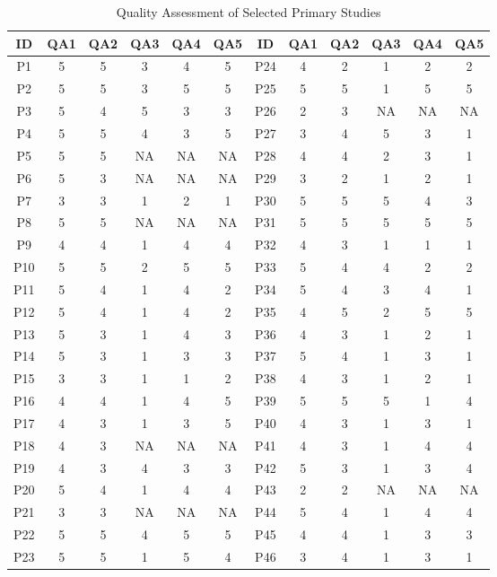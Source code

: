 \begin{table}[htb]
    \centering
        \caption{Quality Assessment of Selected Primary Studies}
\footnotesize
    \begin{tabular}{cccccc|cccccc}
    \hline
      \textbf{ID}&\textbf{QA1} &\textbf{QA2} & \textbf{QA3}  & \textbf{QA4}  & \textbf{QA5}  &\textbf{ID}  & \textbf{QA1}  & \textbf{QA2} & \textbf{QA3}  & \textbf{QA4}  & \textbf{QA5}  \\
    \hline
    
       P1  & 5 & 5 & 3 & 4 & 5 & P24 & 4 & 2 & 1 & 2 & 2 \\
       P2  & 5 & 5 & 3 & 5 & 5 & P25 & 5 & 5 & 1 & 5 & 5 \\
       P3  & 5 & 4 & 5 & 3 & 3 & P26 & 2 & 3 & NA & NA & NA \\
       P4  & 5 & 5 & 4 & 3 & 5 & P27 & 3 & 4 & 5 & 3 & 1 \\
       P5  & 5 & 5 & NA & NA & NA & P28 & 4 & 4 & 2 & 3 & 1\\
       P6  & 5 & 3 & NA & NA & NA & P29 & 3 & 2 & 1 & 2 & 1\\
       P7  & 3 & 3 & 1 & 2 & 1 & P30 & 5 & 5 & 5 & 4 & 3 \\
       P8  & 5 & 5 & NA & NA & NA & P31 & 5 & 5 & 5 & 5 & 5\\
       P9  & 4 & 4 & 1 & 4 & 4 & P32 & 4 & 3 & 1 & 1 & 1 \\
       P10  & 5 & 5 & 2 & 5 & 5 & P33 & 5 & 4 & 4 & 2 & 2 \\
       P11  & 5 & 4 & 1 & 4 & 2 & P34 & 5 & 4 & 3 & 4 & 1\\
       P12  & 5 & 4 & 1 & 4 & 2 & P35 & 4 & 5 & 2 & 5 & 5\\
       P13  & 5 & 3 & 1 & 4 & 3 & P36 & 4 & 3 & 1 & 2 & 1\\
       P14  & 5 & 3 & 1 & 3 & 3 & P37 & 5 & 4 & 1 & 3 & 1 \\
       P15  & 3 & 3 & 1 & 1 & 2 & P38 & 4 & 3 & 1 & 2 & 1 \\
       P16  & 4 & 4 & 1 & 4 & 5 & P39 & 5 & 5 & 5 & 1 & 4\\
       P17  & 4 & 3 & 1 & 3 & 5 & P40 & 4 & 3 & 1 & 3 & 1 \\
       P18  & 4 & 3 & NA & NA & NA & P41 & 4 & 3 & 1 & 4 & 4 \\
       P19  & 4 & 3 & 4 & 3 & 3 & P42 & 5 & 3 & 1 & 3 & 4\\
       P20  & 5 & 4 & 1 & 4 & 4 & P43 & 2 & 2 & NA  & NA & NA\\
       P21  & 3 & 3 & NA & NA & NA & P44 & 5 & 4 & 1 & 4 & 4 \\
       P22  & 5 & 5 & 4 & 5 & 5 & P45 & 4 & 4 & 1 & 3 & 3 \\
       P23  & 5 & 5 & 1 & 5 & 4 & P46 & 3 & 4 & 1 & 3 & 1 \\
    \hline
    \end{tabular}
    \label{tab:quality}
\end{table}

